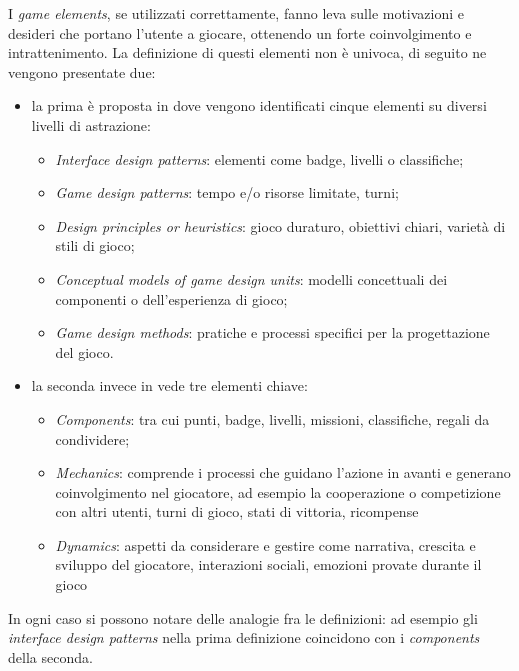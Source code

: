 I \textit{game elements}, se utilizzati correttamente, fanno leva sulle motivazioni e desideri che portano l'utente a giocare, ottenendo un forte coinvolgimento e intrattenimento.
La definizione di questi elementi non è univoca, di seguito ne vengono presentate due:

\begin{itemize}
    \itemsep1em
    \item la prima è proposta in \cite{definingGamification2011} dove vengono identificati cinque elementi su diversi livelli di astrazione:
    \begin{itemize}
        \item \emph{Interface design patterns}: elementi come badge, livelli o classifiche;
        \item \emph{Game design patterns}: tempo e/o risorse limitate, turni;
        \item \emph{Design principles or heuristics}: gioco duraturo, obiettivi chiari, varietà di stili di gioco;
        \item \emph{Conceptual models of game design units}: modelli concettuali dei componenti o dell'esperienza di gioco;
        \item \emph{Game design methods}: pratiche e processi specifici per la progettazione del gioco.
    \end{itemize}
    \item la seconda invece in \cite{Werbach2012ForTW} vede tre elementi chiave:
    \begin{itemize}
        \item \emph{Components}: tra cui punti, badge, livelli, missioni, classifiche, regali da condividere;
        \item \emph{Mechanics}: comprende i processi che guidano l'azione in avanti e generano coinvolgimento nel giocatore, ad esempio la cooperazione o competizione con altri utenti, turni di gioco, stati di vittoria, ricompense
        \item \emph{Dynamics}: aspetti da considerare e gestire come narrativa, crescita e sviluppo del giocatore, interazioni sociali, emozioni provate durante il gioco
    \end{itemize}
\end{itemize}

In ogni caso si possono notare delle analogie fra le definizioni: ad esempio gli \textit{interface design patterns} nella prima definizione coincidono con i \textit{components} della seconda.

